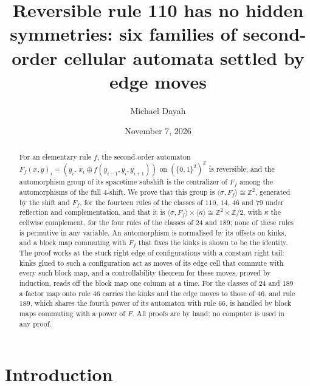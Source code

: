 \documentclass[11pt]{amsart}
\title[Reversible rule 110 has no hidden symmetries]{Reversible rule 110 has no hidden symmetries: six families of second-order cellular automata settled by edge moves}
\author{Michael Dayah}
\date{November 7, 2026}
\theoremstyle{definition}
\theoremstyle{remark}
\theoremstyle{plain}
\newcommand{\Z}{\mathbb{Z}}
\newcommand{\sh}{\sigma}
\begin{document}
\begin{abstract}
For an elementary rule $f$, the second-order automaton $F_f(x,y)_i=(y_i,\,x_i\oplus f(y_{i-1},y_i,y_{i+1}))$ on $(\{0,1\}^2)^{\Z}$ is reversible, and the automorphism group of its spacetime subshift is the centralizer of $F_f$ among the automorphisms of the full $4$-shift. We prove that this group is $\langle\sh,F_f\rangle\cong\Z^2$, generated by the shift and $F_f$, for the fourteen rules of the classes of $110$, $14$, $46$ and $79$ under reflection and complementation, and that it is $\langle\sh,F_f\rangle\times\langle\kappa\rangle\cong\Z^2\times\Z/2$, with $\kappa$ the cellwise complement, for the four rules of the classes of $24$ and $189$; none of these rules is permutive in any variable. An automorphism is normalised by its offsets on kinks, and a block map commuting with $F_f$ that fixes the kinks is shown to be the identity. The proof works at the stuck right edge of configurations with a constant right tail: kinks glued to such a configuration act as moves of its edge cell that commute with every such block map, and a controllability theorem for these moves, proved by induction, reads off the block map one column at a time. For the classes of $24$ and $189$ a factor map onto rule $46$ carries the kinks and the edge moves to those of $46$, and rule $189$, which shares the fourth power of its automaton with rule $66$, is handled by block maps commuting with a power of $F$. All proofs are by hand; no computer is used in any proof.
\end{abstract}

\maketitle

\section{Introduction}\label{sec:intro}
\end{document}
